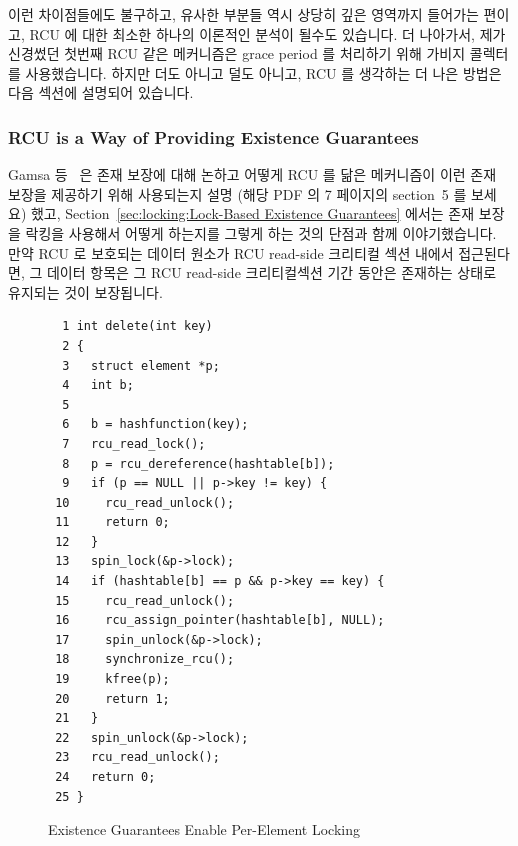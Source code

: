 이런 차이점들에도 불구하고, 유사한 부분들 역시 상당히 깊은 영역까지 들어가는
편이고, RCU 에 대한 최소한 하나의 이론적인 분석이 될수도 있습니다.
더 나아가서, 제가 신경썼던 첫번째 RCU 같은 메커니즘은 grace period 를 처리하기
위해 가비지 콜렉터를 사용했습니다.
하지만 더도 아니고 덜도 아니고, RCU 를 생각하는 더 나은 방법은 다음 섹션에
설명되어 있습니다.

\subsubsection{RCU is a Way of Providing Existence Guarantees}
\label{sec:defer:RCU is a Way of Providing Existence Guarantees}

Gamsa 등~\cite{Gamsa99} 은 존재 보장에 대해 논하고 어떻게 RCU 를 닮은
메커니즘이 이런 존재 보장을 제공하기 위해 사용되는지 설명 (해당 PDF 의 7
페이지의 section~5 를 보세요) 했고,
Section~\ref{sec:locking:Lock-Based Existence Guarantees} 에서는 존재 보장을
락킹을 사용해서 어떻게 하는지를 그렇게 하는 것의 단점과 함께 이야기했습니다.
만약 RCU 로 보호되는 데이터 원소가 RCU read-side 크리티컬 섹션 내에서
접근된다면, 그 데이터 항목은 그 RCU read-side 크리티컬섹션 기간 동안은 존재하는
상태로 유지되는 것이 보장됩니다.

\begin{figure}[tbp]
{ \scriptsize
\begin{verbatim}
  1 int delete(int key)
  2 {
  3   struct element *p;
  4   int b;
  5 
  6   b = hashfunction(key);
  7   rcu_read_lock();
  8   p = rcu_dereference(hashtable[b]);
  9   if (p == NULL || p->key != key) {
 10     rcu_read_unlock();
 11     return 0;
 12   }
 13   spin_lock(&p->lock);
 14   if (hashtable[b] == p && p->key == key) {
 15     rcu_read_unlock();
 16     rcu_assign_pointer(hashtable[b], NULL);
 17     spin_unlock(&p->lock);
 18     synchronize_rcu();
 19     kfree(p);
 20     return 1;
 21   }
 22   spin_unlock(&p->lock);
 23   rcu_read_unlock();
 24   return 0;
 25 }
\end{verbatim}
}
\caption{Existence Guarantees Enable Per-Element Locking}
\label{fig:defer:Existence Guarantees Enable Per-Element Locking}
\end{figure}

